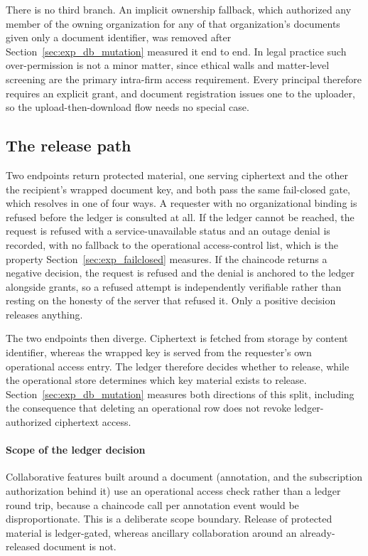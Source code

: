 \documentclass[preprint,12pt]{elsarticle}
\begin{document}
There is no third branch. An implicit ownership fallback, which authorized
any member of the owning organization for any of that organization's documents
given only a document identifier, was removed after
Section~\ref{sec:exp_db_mutation} measured it end to end. In legal practice
such over-permission is not a minor matter, since ethical walls and
matter-level screening are the primary intra-firm access requirement. Every
principal therefore requires an explicit grant, and document registration
issues one to the uploader, so the upload-then-download flow needs no special
case.

\subsection{The release path}
\label{sec:releasepath}

Two endpoints return protected material, one serving ciphertext and the
other the recipient's wrapped document key, and both pass the same fail-closed gate,
which resolves in one of four ways. A requester with no organizational binding
is refused before the ledger is consulted at all. If the ledger cannot be
reached, the request is refused with a service-unavailable status and an outage
denial is recorded, with no fallback to the operational access-control list,
which is the property Section~\ref{sec:exp_failclosed} measures. If the
chaincode returns a negative decision, the request is refused and the denial is
anchored to the ledger alongside grants, so a refused attempt is independently
verifiable rather than resting on the honesty of the server that refused it.
Only a positive decision releases anything.

The two endpoints then diverge. Ciphertext is fetched from storage by
content identifier, whereas the wrapped key is served from the requester's own
operational access entry. The ledger therefore decides whether to release,
while the operational store determines which key material exists to release.
Section~\ref{sec:exp_db_mutation} measures both directions of this split,
including the consequence that deleting an operational row does not revoke
ledger-authorized ciphertext access.

\paragraph{Scope of the ledger decision}
Collaborative features built around a document (annotation, and the
subscription authorization behind it) use an operational access check rather
than a ledger round trip, because a chaincode call per annotation event would be
disproportionate. This is a deliberate scope boundary. Release of protected
material is ledger-gated, whereas ancillary collaboration around an
already-released document is not.
\end{document}

